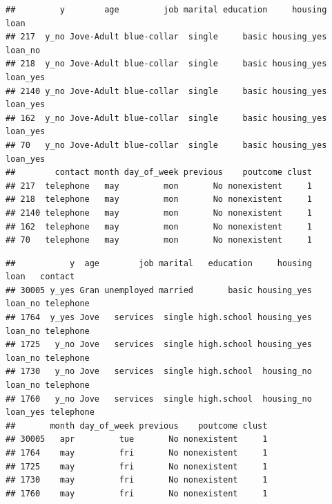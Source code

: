 \documentclass[
]{article}
\newenvironment{Shaded}{\begin{snugshade}}{\end{snugshade}}
\newcommand{\DecValTok}[1]{\textcolor[rgb]{0.00,0.00,0.81}{#1}}
\newcommand{\FunctionTok}[1]{\textcolor[rgb]{0.00,0.00,0.00}{#1}}
\newcommand{\NormalTok}[1]{#1}
\newcommand{\SpecialCharTok}[1]{\textcolor[rgb]{0.00,0.00,0.00}{#1}}
\begin{document}
\begin{Shaded}
\end{Shaded}

\begin{verbatim}
##         y        age         job marital education     housing     loan
## 217  y_no Jove-Adult blue-collar  single     basic housing_yes  loan_no
## 218  y_no Jove-Adult blue-collar  single     basic housing_yes loan_yes
## 2140 y_no Jove-Adult blue-collar  single     basic housing_yes loan_yes
## 162  y_no Jove-Adult blue-collar  single     basic housing_yes loan_yes
## 70   y_no Jove-Adult blue-collar  single     basic housing_yes loan_yes
##        contact month day_of_week previous    poutcome clust
## 217  telephone   may         mon       No nonexistent     1
## 218  telephone   may         mon       No nonexistent     1
## 2140 telephone   may         mon       No nonexistent     1
## 162  telephone   may         mon       No nonexistent     1
## 70   telephone   may         mon       No nonexistent     1
\end{verbatim}

\begin{Shaded}
\end{Shaded}

\begin{verbatim}
##           y  age        job marital   education     housing     loan   contact
## 30005 y_yes Gran unemployed married       basic housing_yes  loan_no telephone
## 1764  y_yes Jove   services  single high.school housing_yes  loan_no telephone
## 1725   y_no Jove   services  single high.school housing_yes  loan_no telephone
## 1730   y_no Jove   services  single high.school  housing_no  loan_no telephone
## 1760   y_no Jove   services  single high.school  housing_no loan_yes telephone
##       month day_of_week previous    poutcome clust
## 30005   apr         tue       No nonexistent     1
## 1764    may         fri       No nonexistent     1
## 1725    may         fri       No nonexistent     1
## 1730    may         fri       No nonexistent     1
## 1760    may         fri       No nonexistent     1
\end{verbatim}
\end{document}
